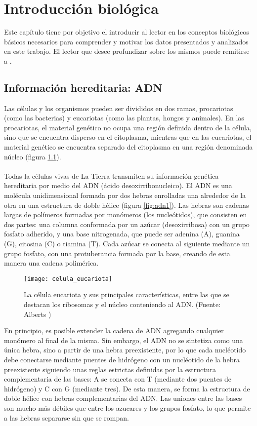 \chapter{Introducción biológica}
Este capítulo tiene por objetivo el introducir al lector en los conceptos biológicos básicos necesarios para comprender y motivar los datos presentados y analizados en este trabajo. El lector que desee profundizar sobre los mismos puede remitirse a \cite{Domany2003, Alberts2015}.
\section{Información hereditaria: ADN}
Las células y los organismos pueden ser divididos en dos ramas, procariotas (como las bacterias) y eucariotas (como las plantas, hongos y animales). En las procariotas, el material genético no ocupa una región definida dentro de la célula, sino que se encuentra disperso en el citoplasma, mientras que en las eucariotas, el material genético se encuentra separado del citoplasma en una región denominada núcleo (figura \ref{fig:celula_eucariota}).\\\\
Todas la células vivas de La Tierra transmiten su información genética hereditaria por medio del ADN (ácido desoxirribonucleico). El ADN es una molécula unidimensional formada por dos hebras enrolladas una alrededor de la otra en una estructura de doble hélice (figura \ref{fig:adn1}). Las hebras son cadenas largas de polímeros formadas por monómeros (los nucleótidos), que consisten en dos partes: una columna conformada por un azúcar (desoxirribosa) con un grupo fosfato adherido, y una base nitrogenada, que puede ser adenina (A), guanina (G), citosina (C) o tiamina (T). Cada azúcar se conecta al siguiente mediante un grupo fosfato, con una protuberancia formada por la base, creando de esta manera una cadena polimérica. 
\begin{figure}[h]
    \centering
    \texttt{[image: celula\_eucariota]}
    \caption{La célula eucariota y sus principales características, entre las que se destacan los ribosomas y el núcleo conteniendo al ADN. (Fuente: Alberts \cite{Alberts2015})}
    \label{fig:celula_eucariota}
\end{figure}
En principio, es posible extender la cadena de ADN agregando cualquier monómero al final de la misma. Sin embargo, el ADN no se sintetiza como una única hebra, sino a partir de una hebra preexistente, por lo que cada nucléotido debe conectarse mediante puentes de hidrógeno con un nucléotido de la hebra preexistente siguiendo unas reglas estrictas definidas por la estructura complementaria de las bases: A se conecta con T (mediante dos puentes de hidrógeno) y C con G (mediante tres). De esta manera, se forma la estructura de doble hélice con hebras complementarias del ADN. Las uniones entre las bases son mucho más débiles que entre los azucares y los grupos fosfato, lo que permite a las hebras separarse sin que se rompan.\\\\
